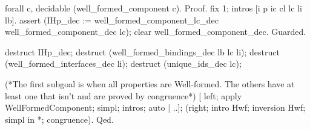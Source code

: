   forall c, decidable (well_formed_component c).
Proof.
 fix 1; intros [i p ic cl lc li lb].
 assert (IHp_dec := 
     well_formed_component_lc_dec well_formed_component_dec lc);
 clear well_formed_component_dec.
 Guarded. 

 destruct IHp_dec; destruct (well_formed_bindings_dec lb lc li);
 destruct (well_formed_interfaces_dec li); 
 destruct (unique_ids_dec lc);
  
 (*The first subgoal is when all properties are Well-formed. The 
 others have at least one that isn't and are proved by congruence*)
  [ left; apply WellFormedComponent; simpl; intros; auto | ..];
  (right; intro Hwf; inversion Hwf; simpl in *; congruence).
Qed.